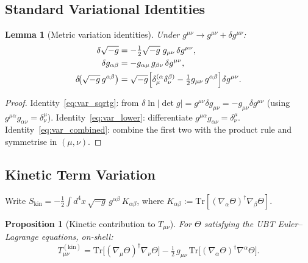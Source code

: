 \documentclass[12pt]{article}
\newtheorem{lemma}[definition]{Lemma}
\newtheorem{proposition}[definition]{Proposition}
\newcommand{\Tr}{\mathrm{Tr}}
\begin{document}
\subsection{Standard Variational Identities}

\begin{lemma}[Metric variation identities]
\label{lem:var_ids}
Under $g^{\mu\nu} \to g^{\mu\nu} + \delta g^{\mu\nu}$:
\begin{align}
  \delta\sqrt{-g}
    &= -\tfrac{1}{2}\sqrt{-g}\; g_{\mu\nu}\,\delta g^{\mu\nu},
    \label{eq:var_sqrtg} \\
  \delta g_{\alpha\beta}
    &= -g_{\alpha\mu}\,g_{\beta\nu}\,\delta g^{\mu\nu},
    \label{eq:var_lower} \\
  \delta\!\bigl(\sqrt{-g}\,g^{\alpha\beta}\bigr)
    &= \sqrt{-g}\Bigl[\delta^{(\alpha}_\mu\delta^{\beta)}_\nu
       - \tfrac{1}{2}g_{\mu\nu}\,g^{\alpha\beta}\Bigr]\delta g^{\mu\nu}.
    \label{eq:var_combined}
\end{align}
\end{lemma}

\begin{proof}
Identity~\eqref{eq:var_sqrtg}: from $\delta\ln|\det g| = g^{\mu\nu}\delta g_{\mu\nu}
= -g_{\mu\nu}\delta g^{\mu\nu}$ (using $g^{\mu\alpha}g_{\alpha\nu}=\delta^\mu_\nu$).
Identity~\eqref{eq:var_lower}: differentiate $g^{\mu\alpha}g_{\alpha\nu}=\delta^\mu_\nu$.
Identity~\eqref{eq:var_combined}: combine the first two with the product rule
and symmetrise in $(\mu,\nu)$.
\end{proof}

\subsection{Kinetic Term Variation}

Write $S_{\mathrm{kin}} = -\tfrac{1}{2}\int d^4x\,\sqrt{-g}\,
g^{\alpha\beta}\,K_{\alpha\beta}$, where
$K_{\alpha\beta} := \Tr[(\nabla_\alpha\Theta)^\dagger\nabla_\beta\Theta]$.

\begin{proposition}[Kinetic contribution to $T_{\mu\nu}$]
\label{prop:T_kin}
For $\Theta$ satisfying the UBT Euler--Lagrange equations, on-shell:
\begin{equation}
  \label{eq:T_kin}
  \boxed{
    T^{(\mathrm{kin})}_{\mu\nu}
    = \Tr\!\bigl[(\nabla_\mu\Theta)^\dagger\nabla_\nu\Theta\bigr]
      - \tfrac{1}{2}\,g_{\mu\nu}\,
        \Tr\!\bigl[(\nabla_\alpha\Theta)^\dagger\nabla^\alpha\Theta\bigr].
  }
\end{equation}
\end{proposition}
\end{document}
